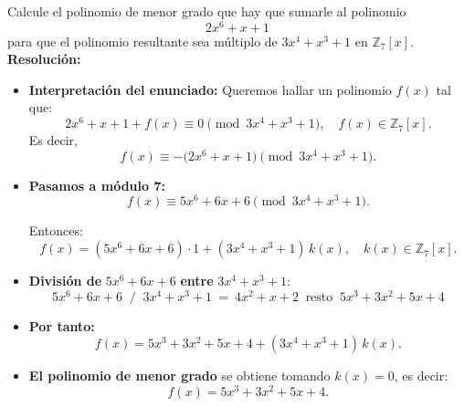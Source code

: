 \documentclass[a4paper,12pt]{article}
\begin{document}
\begin{ejercicio}[title=Ejercicio 53]
Calcule el polinomio de menor grado que hay que sumarle al polinomio 
\[
2x^6 + x + 1
\]
para que el polinomio resultante sea múltiplo de \(3x^4 + x^3 + 1\) en \(\mathbb{Z}_7[x]\).
\tcblower
\textbf{Resolución:}

\begin{itemize}
    \item \textbf{Interpretación del enunciado:}  
    Queremos hallar un polinomio \(f(x)\) tal que:
    \[
    2x^6 + x + 1 + f(x) \equiv 0 \pmod{3x^4 + x^3 + 1}, \quad f(x) \in \mathbb{Z}_7[x].
    \]
    Es decir,
    \[
    f(x) \equiv -\big(2x^6 + x + 1\big) \pmod{3x^4 + x^3 + 1}.
    \]

    \item \textbf{Pasamos a módulo 7:}  
    \[
    f(x) \equiv 5x^6 + 6x + 6 \pmod{3x^4 + x^3 + 1}.
    \]

    Entonces:
    \[
    f(x) = (5x^6 + 6x + 6) \cdot 1 + (3x^4 + x^3 + 1)\,k(x), \quad k(x) \in \mathbb{Z}_7[x].
    \]

    \item \textbf{División de } \(5x^6 + 6x + 6\) \textbf{ entre } \(3x^4 + x^3 + 1\):
    \[
5x^6 + 6x + 6 \ \text{ / }\ 3x^4 + x^3 + 1 \ =\ 4x^2 + x + 2 \ \text{ resto }\ 5x^3 + 3x^2 + 5x + 4
\]

    \item \textbf{Por tanto:}
    \[
    f(x) = 5x^3 + 3x^2 + 5x + 4 + (3x^4 + x^3 + 1)\,k(x).
    \]

    \item \textbf{El polinomio de menor grado} se obtiene tomando \(k(x) = 0\), es decir:
    \[
    \boxed{f(x) = 5x^3 + 3x^2 + 5x + 4.}
    \]
\end{itemize}

\end{ejercicio}
\end{document}
